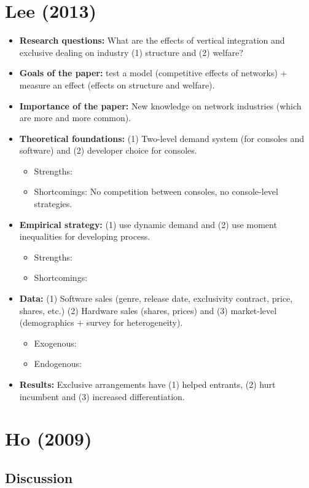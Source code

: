 \section{Lee (2013)}

\begin{itemize}
\item \textbf{Research questions:} What are the effects of vertical integration and exclusive dealing on industry (1) structure and (2) welfare?
\item \textbf{Goals of the paper:} test a model (competitive effects of networks) + measure an effect (effects on structure and welfare).
\item \textbf{Importance of the paper:} New knowledge on network industries (which are more and more common).
\item \textbf{Theoretical foundations:} (1) Two-level demand system (for consoles and software) and (2) developer choice for consoles. \begin{itemize}
\item Strengths: 
\item Shortcomings: No competition between consoles, no console-level strategies.
\end{itemize}
\item \textbf{Empirical strategy:} (1) use dynamic demand and (2) use moment inequalities for developing process.\begin{itemize}
\item Strengths: 
\item Shortcomings: 
\end{itemize}
\item \textbf{Data:} (1) Software sales (genre, release date, exclusivity contract, price, shares, etc.) (2) Hardware sales (shares, prices) and (3) market-level (demographics + survey for heterogeneity).
\begin{itemize}
\item Exogenous: 
\item Endogenous:
\end{itemize}
\item \textbf{Results:} Exclusive arrangements have (1) helped entrants, (2) hurt incumbent and (3) increased differentiation. 
\end{itemize}

\section{Ho (2009)}

\subsection{Discussion}


